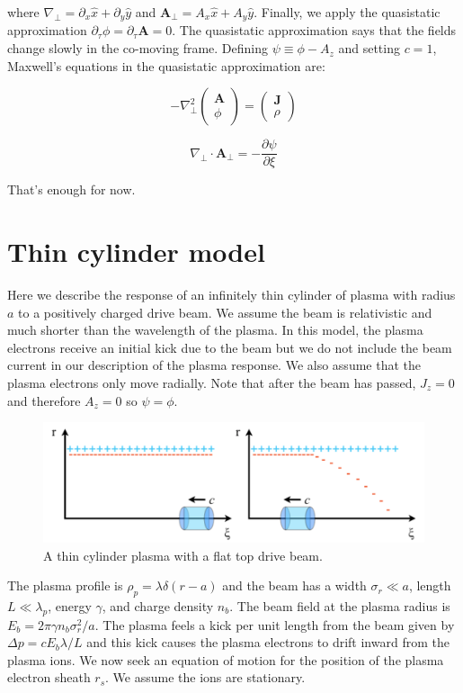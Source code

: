 \documentclass[aps,prl,preprint,groupedaddress]{revtex4-1}
\newcommand{\webvector}[2]{\left( \begin{array}{c} #1 \\ #2 \end{array} \right)}
\begin{document}
where $\nabla_\perp = \partial_x \hat x + \partial_y \hat y$ and $\mathbf{A}_\perp = A_x \hat x + A_y \hat y$. Finally, we apply the quasistatic approximation $\partial_\tau \phi = \partial_\tau \mathbf{A} = 0$. The quasistatic approximation says that the fields change slowly in the co-moving frame. Defining $\psi \equiv \phi - A_z$ and setting $c = 1$, Maxwell's equations in the quasistatic approximation are:

\begin{equation}\label{eq:max_qs}
-\nabla^2_\perp \webvector{\mathbf{A}}{\phi} = \webvector{\mathbf{J}}{\rho}
\end{equation}

\begin{equation}\label{eq:gauge_qs}
\nabla_\perp \cdot \mathbf{A}_\perp = -\frac{\partial \psi}{\partial \xi}
\end{equation}

That's enough for now.

\section{Thin cylinder model}

Here we describe the response of an infinitely thin cylinder of plasma with radius $a$ to a positively charged drive beam. We assume the beam is relativistic and much shorter than the wavelength of the plasma. In this model, the plasma electrons receive an initial kick due to the beam but we do not include the beam current in our description of the plasma response. We also assume that the plasma electrons only move radially. Note that after the beam has passed, $J_z=0$ and therefore $A_z=0$ so $\psi=\phi$.

\begin{figure}[ht]\label{fig:thin_cyl}
  \centering
    \includegraphics[width=150mm]{./figures/thin_cyl.pdf}
      \caption{A thin cylinder plasma with a flat top drive beam.}
\end{figure}

The plasma profile is $\rho_p = \lambda \delta(r - a)$ and the beam has a width $\sigma_r \ll a$, length $L \ll \lambda_p$, energy $\gamma$, and charge density $n_b$. The beam field at the plasma radius is $E_b = 2\pi \gamma n_b \sigma_r^2/a$. The plasma feels a kick per unit length from the beam given by $\Delta p = c E_b \lambda/L$ and this kick causes the plasma electrons to drift inward from the plasma ions. We now seek an equation of motion for the position of the plasma electron sheath $r_s$. We assume the ions are stationary.
\end{document}
